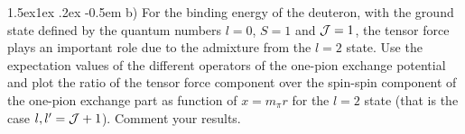 \documentclass[%
oneside,                 %
final,                   %
10pt]{article}
\makeatletter
\newenvironment{doconceexercise}{}{}
\newcommand\subex{\@startsection{paragraph}{4}{\z@}%
                  {1.5ex\@plus1ex \@minus.2ex}%
                  {-0.5em}%
                  {\normalfont\normalsize\bfseries}}
\makeatother
\begin{document}
\begin{doconceexercise}
\subex{b)}
For the binding energy of the deuteron, with the ground state defined by the quantum numbers $l=0$, $S=1$ and ${\cal J}=1$, the tensor force plays an important role due to the admixture from the $l=2$ state. Use the expectation values of the different operators of the one-pion exchange potential and plot the ratio of the tensor force component over the spin-spin component of the one-pion exchange part as function of $x=m_\pi r$ for the $l=2$ state (that is the case $l,l'={\cal J}+1$). Comment your results.

\end{doconceexercise}




\printindex
\end{document}
